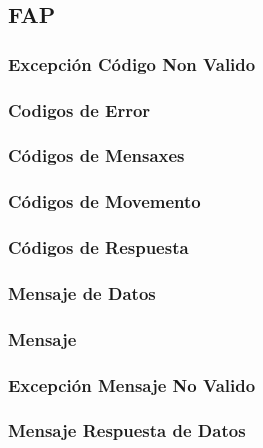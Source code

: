 \documentclass[a4paper,titlepage]{article}
\begin{document}
\subsection{FAP}

\subsubsection{Excepción Código Non Valido}

\subsubsection{Codigos de Error}

\subsubsection{Códigos de Mensaxes}

\subsubsection{Códigos de Movemento}

\subsubsection{Códigos de Respuesta}

\subsubsection{Mensaje de Datos}

\subsubsection{Mensaje}

\subsubsection{Excepción Mensaje No Valido}

\subsubsection{Mensaje Respuesta de Datos}

\end{document}
